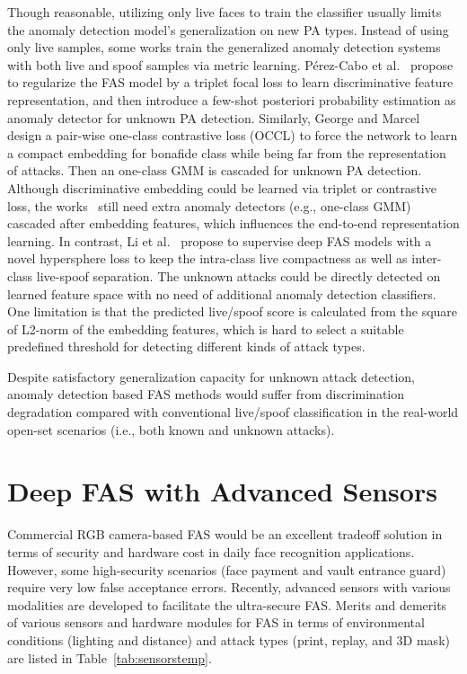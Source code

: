 \documentclass[10pt,journal,compsoc]{IEEEtran}
\begin{document}
Though reasonable, utilizing only live faces to train the classifier usually limits the anomaly detection model's generalization on new PA types. Instead of using only live samples, some works train the generalized anomaly detection systems with both live and spoof samples via metric learning. P{\'e}rez-Cabo et al.~\cite{perez2019deep} propose to regularize the FAS model by a triplet focal loss to learn discriminative feature representation, and then introduce a few-shot posteriori probability estimation as anomaly detector for unknown PA detection. Similarly, George and Marcel~\cite{george2020learning} design a pair-wise one-class contrastive loss (OCCL) to force the network to learn a compact embedding for bonafide class while being far from the representation of attacks. Then an one-class GMM is cascaded for unknown PA detection. Although discriminative embedding could be learned via triplet or contrastive loss, the works~\cite{perez2019deep,george2020learning} still need extra anomaly detectors (e.g., one-class GMM) cascaded after embedding features, which influences the end-to-end representation learning. In contrast, Li et al.~\cite{li2020unseen} propose to supervise deep FAS models with a novel hypersphere loss to keep the intra-class live compactness as well as inter-class live-spoof separation. The unknown attacks could be directly detected on learned feature space with no need of additional anomaly detection classifiers. One limitation is that the predicted live/spoof score is calculated from the square of L2-norm of the embedding features, which is hard to select a suitable predefined threshold for detecting different kinds of attack types.


Despite satisfactory generalization capacity for unknown attack detection, anomaly detection based FAS methods would suffer from discrimination degradation compared with conventional live/spoof classification in the real-world open-set scenarios (i.e., both known and unknown attacks). 



\section{Deep FAS with Advanced Sensors} \label{sec:multimodal}


Commercial RGB camera-based FAS would be an excellent tradeoff solution in terms of security and hardware cost in daily face recognition applications. However, some high-security scenarios (face payment and vault entrance guard) require very low false acceptance errors. Recently, advanced sensors with various modalities are developed to facilitate the ultra-secure FAS. Merits and demerits of various sensors and hardware modules for FAS in terms of environmental conditions (lighting and distance) and attack types (print, replay, and 3D mask) are listed in Table~\ref{tab:sensorstemp}. 
\end{document}
